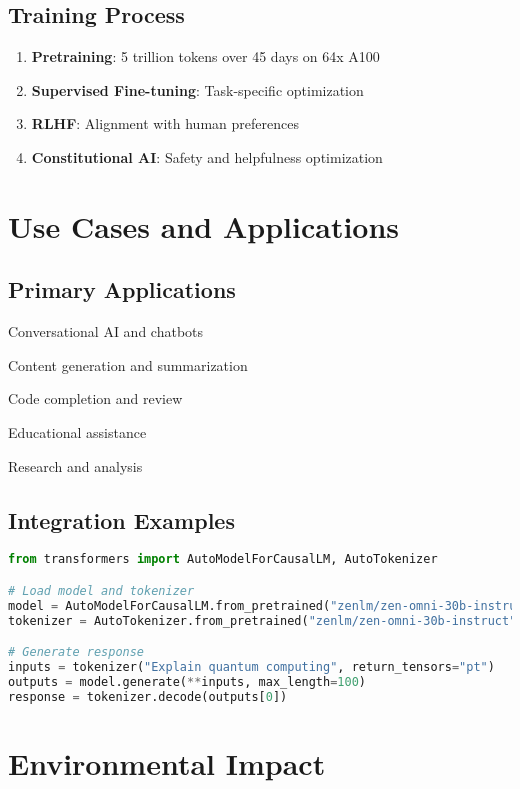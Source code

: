 \documentclass[11pt,a4paper]{article}
\begin{document}
\subsection{Training Process}
\begin{enumerate}
    \item \textbf{Pretraining}: 5 trillion tokens over 45 days on 64x A100
    \item \textbf{Supervised Fine-tuning}: Task-specific optimization
    \item \textbf{RLHF}: Alignment with human preferences
    \item \textbf{Constitutional AI}: Safety and helpfulness optimization
\end{enumerate}

\section{Use Cases and Applications}

\subsection{Primary Applications}
\item Conversational AI and chatbots
\item Content generation and summarization
\item Code completion and review
\item Educational assistance
\item Research and analysis

\subsection{Integration Examples}

\begin{lstlisting}[language=Python, caption=Basic Usage Example]
from transformers import AutoModelForCausalLM, AutoTokenizer

# Load model and tokenizer
model = AutoModelForCausalLM.from_pretrained("zenlm/zen-omni-30b-instruct")
tokenizer = AutoTokenizer.from_pretrained("zenlm/zen-omni-30b-instruct")

# Generate response
inputs = tokenizer("Explain quantum computing", return_tensors="pt")
outputs = model.generate(**inputs, max_length=100)
response = tokenizer.decode(outputs[0])
\end{lstlisting}

\section{Environmental Impact}
\end{document}
